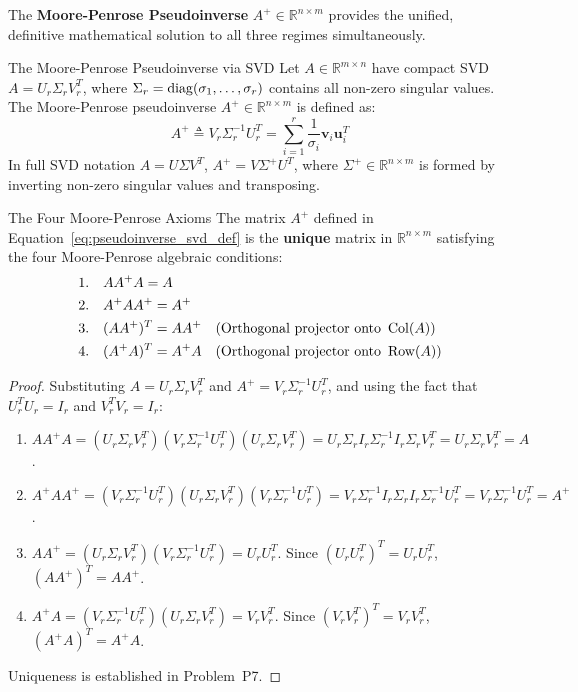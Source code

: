 The \textbf{Moore-Penrose Pseudoinverse} $A^+ \in \mathbb{R}^{n \times m}$ provides the unified, definitive mathematical solution to all three regimes simultaneously.

\begin{definitionbox}{The Moore-Penrose Pseudoinverse via SVD}
Let $A \in \mathbb{R}^{m \times n}$ have compact SVD $A = U_r \Sigma_r V_r^T$, where $\Sigma_r = \operatorname{diag}(\sigma_1, \dots, \sigma_r)$ contains all non-zero singular values. The Moore-Penrose pseudoinverse $A^+ \in \mathbb{R}^{n \times m}$ is defined as:
\begin{equation}
A^+ \triangleq V_r \Sigma_r^{-1} U_r^T = \sum_{i=1}^r \frac{1}{\sigma_i} \mathbf{v}_i \mathbf{u}_i^T
\label{eq:pseudoinverse_svd_def}
\end{equation}
In full SVD notation $A = U \Sigma V^T$, $A^+ = V \Sigma^+ U^T$, where $\Sigma^+ \in \mathbb{R}^{n \times m}$ is formed by inverting non-zero singular values and transposing.
\end{definitionbox}

\begin{theorembox}{The Four Moore-Penrose Axioms}
The matrix $A^+$ defined in Equation~\eqref{eq:pseudoinverse_svd_def} is the \textbf{unique} matrix in $\mathbb{R}^{n \times m}$ satisfying the four Moore-Penrose algebraic conditions:
\begin{align}
1. \quad & A A^+ A = A \label{eq:mp_axiom1} \\
2. \quad & A^+ A A^+ = A^+ \label{eq:mp_axiom2} \\
3. \quad & (A A^+)^T = A A^+ \quad (\text{Orthogonal projector onto } \operatorname{Col}(A)) \label{eq:mp_axiom3} \\
4. \quad & (A^+ A)^T = A^+ A \quad (\text{Orthogonal projector onto } \operatorname{Row}(A)) \label{eq:mp_axiom4}
\end{align}
\end{theorembox}

\begin{proof}
Substituting $A = U_r \Sigma_r V_r^T$ and $A^+ = V_r \Sigma_r^{-1} U_r^T$, and using the fact that $U_r^T U_r = I_r$ and $V_r^T V_r = I_r$:
\begin{enumerate}
    \item $A A^+ A = (U_r \Sigma_r V_r^T)(V_r \Sigma_r^{-1} U_r^T)(U_r \Sigma_r V_r^T) = U_r \Sigma_r I_r \Sigma_r^{-1} I_r \Sigma_r V_r^T = U_r \Sigma_r V_r^T = A$.
    \item $A^+ A A^+ = (V_r \Sigma_r^{-1} U_r^T)(U_r \Sigma_r V_r^T)(V_r \Sigma_r^{-1} U_r^T) = V_r \Sigma_r^{-1} I_r \Sigma_r I_r \Sigma_r^{-1} U_r^T = V_r \Sigma_r^{-1} U_r^T = A^+$.
    \item $A A^+ = (U_r \Sigma_r V_r^T)(V_r \Sigma_r^{-1} U_r^T) = U_r U_r^T$. Since $(U_r U_r^T)^T = U_r U_r^T$, $(A A^+)^T = A A^+$.
    \item $A^+ A = (V_r \Sigma_r^{-1} U_r^T)(U_r \Sigma_r V_r^T) = V_r V_r^T$. Since $(V_r V_r^T)^T = V_r V_r^T$, $(A^+ A)^T = A^+ A$.
\end{enumerate}
Uniqueness is established in Problem~P7.
\end{proof}

